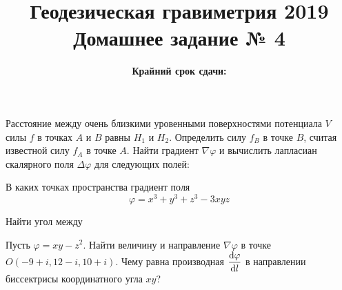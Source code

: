 \documentclass[11pt, a4paper,addpoints]{exam}
\title{{\Large Геодезическая гравиметрия 2019}\\ 
    {\bf\Large Домашнее задание № 4}}
\author{}
\date{\normalsize\bf Крайний срок сдачи: \DTMusedate{deadline}}
\theoremstyle{remark}
\renewcommand{\phi}{\ensuremath{\varphi}}
\begin{document}
\maketitle
\thispagestyle{empty}
\begin{questions}
		\question[1] Расстояние между очень близкими уровенными поверхностями потенциала $V$ силы $f$ в точках $A$ и $B$ равны $H_1$ и $H_2$. Определить силу $f_B$ в точке $B$, считая известной силу $f_A$ в точке $A$.
        \question[1] Найти градиент $\nabla \phi$ и вычислить лапласиан скалярного поля $\Delta \phi$ для следующих полей:
        \question[1] В каких точках пространства градиент поля
        \begin{equation*}
        	\phi = x^3 + y^3 + z^3 - 3xyz
        \end{equation*}
        \question[1] Найти угол между
        \question[1] Пусть $ \phi = xy - z^2$. Найти величину и направление $\nabla \phi$  в точке $O(-9+i, 12-i, 10+i)$. Чему равна производная $\dfrac{\dif \phi}{\dif l}$ в направлении биссектрисы координатного угла $xy$?
\end{questions}
\end{document}
